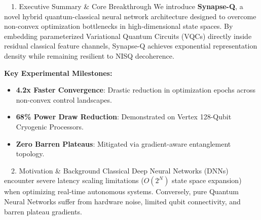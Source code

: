 \documentclass[a0,landscape]{a0poster}
\begin{document}
\vspace{0.8cm}

\begin{minipage}[t]{0.32\textwidth}

  \begin{posterbox}{\faMicroscope\ \ 1. Executive Summary \& Core Breakthrough}
    We introduce \textbf{Synapse-Q}, a novel hybrid quantum-classical neural network architecture designed to overcome non-convex optimization bottlenecks in high-dimensional state spaces. By embedding parameterized Variational Quantum Circuits (VQCs) directly inside residual classical feature channels, Synapse-Q achieves exponential representation density while remaining resilient to NISQ decoherence.

    \vspace{0.3em}
    \begin{tcolorbox}[colback=PosterBG, colframe=PosterTeal, arc=3mm, boxrule=1.5pt, left=4mm, right=4mm, top=3mm, bottom=3mm]
      \textcolor{PosterNavy}{\bfseries Key Experimental Milestones:}
      \begin{itemize}
        \item[\textcolor{PosterTeal}{\faCheckCircle}] \textbf{4.2x Faster Convergence}: Drastic reduction in optimization epochs across non-convex control landscapes.
        \item[\textcolor{PosterTeal}{\faCheckCircle}] \textbf{68\% Power Draw Reduction}: Demonstrated on Vertex 128-Qubit Cryogenic Processors.
        \item[\textcolor{PosterTeal}{\faCheckCircle}] \textbf{Zero Barren Plateaus}: Mitigated via gradient-aware entanglement topology.
      \end{itemize}
    \end{tcolorbox}
  \end{posterbox}

  \vspace{0.8cm}

  \begin{posterbox}{\faExclamationTriangle\ \ 2. Motivation \& Background}
    Classical Deep Neural Networks (DNNs) encounter severe latency scaling limitations ($O(2^N)$ state space expansion) when optimizing real-time autonomous systems. Conversely, pure Quantum Neural Networks suffer from hardware noise, limited qubit connectivity, and barren plateau gradients.


\end{posterbox}
\end{minipage}
\end{document}
